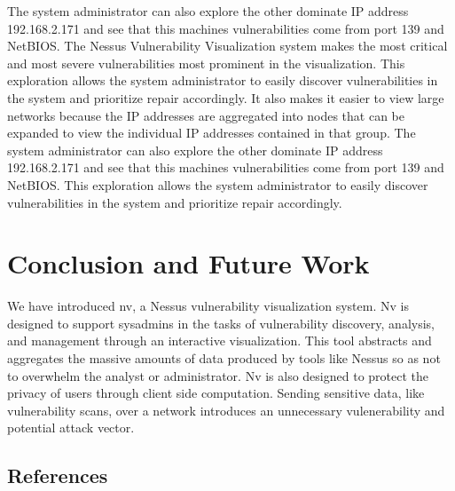 \documentclass{acm_proc_article-sp}
\begin{document}
The system administrator can also explore the other dominate IP address 192.168.2.171 and
see that this machines vulnerabilities come from port 139 and NetBIOS. The
Nessus Vulnerability Visualization system makes the most critical and most
severe vulnerabilities most prominent in the visualization. This
exploration allows the system administrator to easily discover vulnerabilities
in the system and prioritize repair accordingly. It also makes it easier to view large
networks because the IP addresses are aggregated into nodes that can be expanded to view
the individual IP addresses contained in that group. The system administrator can also explore the other dominate IP address 192.168.2.171 and
see that this machines vulnerabilities come from port 139 and NetBIOS. This
exploration allows the system administrator to easily discover vulnerabilities
in the system and prioritize repair accordingly. 



\section{Conclusion and Future Work}

We have introduced nv, a Nessus vulnerability visualization system.
Nv is designed to support sysadmins in the tasks of vulnerability discovery, analysis, and management through an interactive visualization.
This tool abstracts and aggregates the massive amounts of data produced by tools like Nessus so as not to overwhelm the analyst or administrator.
Nv is also designed to protect the privacy of users through client side computation.
Sending sensitive data, like vulnerability scans, over a network introduces an unnecessary vulenerability and potential attack vector.





\subsection{References}
\end{document}
